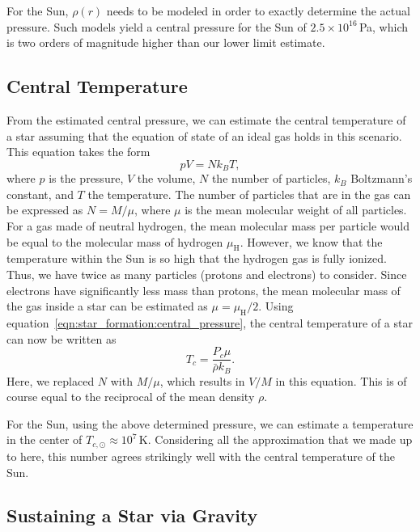 For the Sun, $\rho(r)$ needs to be modeled in order to exactly determine the actual pressure. Such models yield a central pressure for the Sun of $2.5\times10^{16}$\,Pa, which is two orders of magnitude higher than our lower limit estimate.


\subsection{Central Temperature}

From the estimated central pressure, we can estimate the central temperature of a star assuming that the equation of state of an ideal gas holds in this scenario. This equation takes the form
\begin{equation}
    pV = Nk_BT,
\end{equation}
where $p$ is the pressure, $V$ the volume, $N$ the number of particles, $k_B$ Boltzmann's constant, and $T$ the temperature. The number of particles that are in the gas can be expressed as $N=M/\mu$, where $\mu$ is the mean molecular weight of all particles. For a gas made of neutral hydrogen, the mean molecular mass per particle would be equal to the molecular mass of hydrogen $\mu_\mathrm{H}$. However, we know that the temperature within the Sun is so high that the hydrogen gas is fully ionized. Thus, we have twice as many particles (protons and electrons) to consider. Since electrons have significantly less mass than protons, the mean molecular mass of the gas inside a star can be estimated as $\mu = \mu_\mathrm{H}/2$. Using equation~\eqref{eqn:star_formation:central_pressure}, the central temperature of a star can now be written as
\begin{equation}
    T_c = \frac{P_c \mu}{\bar{\rho} k_B}.
    \label{eqn:star_formation:central_temperature}
\end{equation}
Here, we replaced $N$ with $M/\mu$, which results in $V/M$ in this equation. This is of course equal to the reciprocal of the mean density $\rho$.

For the Sun, using the above determined pressure, we can estimate a temperature in the center of $T_{c,\odot} \approx 10^{7}$\,K. Considering all the approximation that we made up to here, this number agrees strikingly well with the central temperature of the Sun.



\subsection{Sustaining a Star via Gravity}

